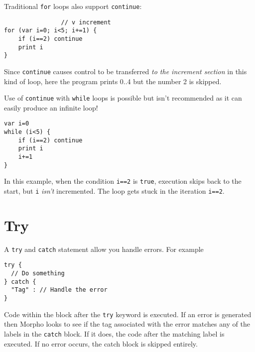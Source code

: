 Traditional \texttt{for} loops also support \texttt{continue}:

\begin{lstlisting}
                // v increment
for (var i=0; i<5; i+=1) {
    if (i==2) continue
    print i
}
\end{lstlisting}

Since \texttt{continue} causes control to be transferred \emph{to the
increment section} in this kind of loop, here the program prints 0..4
but the number 2 is skipped.

Use of \texttt{continue} with \texttt{while} loops is possible but isn't
recommended as it can easily produce an infinite loop!

\begin{lstlisting}
var i=0
while (i<5) {
    if (i==2) continue
    print i
    i+=1
}
\end{lstlisting}

In this example, when the condition \texttt{i==2} is \texttt{true},
execution skips back to the start, but \texttt{i} \emph{isn't}
incremented. The loop gets stuck in the iteration \texttt{i==2}.

\hypertarget{try}{%
\section{Try}\label{try}}

A \texttt{try} and \texttt{catch} statement allow you handle errors. For
example

\begin{lstlisting}
try {
  // Do something
} catch {
  "Tag" : // Handle the error
}
\end{lstlisting}

Code within the block after the \texttt{try} keyword is executed. If an
error is generated then Morpho looks to see if the tag associated with
the error matches any of the labels in the \texttt{catch} block. If it
does, the code after the matching label is executed. If no error occurs,
the catch block is skipped entirely.
